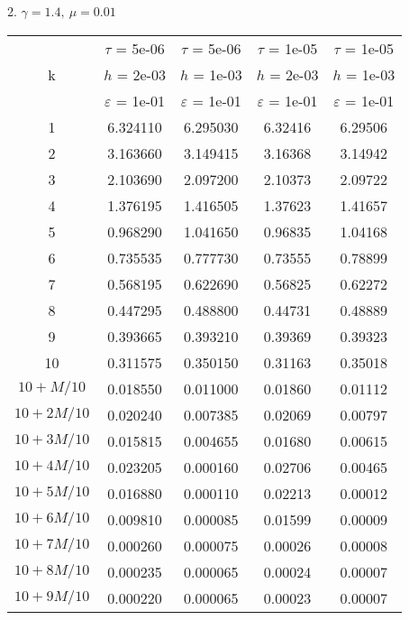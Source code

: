 2. $\gamma = 1.4, \ \mu = 0.01$
\begin{center}
	\begin{tabular}{ |c|c|c|c|c| } 
		\hline
		& $\tau$ = 5e-06 & $\tau$ = 5e-06 & $\tau$ = 1e-05 & $\tau$ = 1e-05 \\ 
		k & $h$ = 2e-03 & $h$ = 1e-03 & $h$ = 2e-03 & $h$ = 1e-03 \\ 
		& $\varepsilon$ = 1e-01 & $\varepsilon$ = 1e-01 & $\varepsilon$ = 1e-01 & $\varepsilon$ = 1e-01 \\ 
		\hline
		1 & 6.324110 & 6.295030 & 6.32416 & 6.29506 \\
		\hline
		2 & 3.163660 & 3.149415 & 3.16368 & 3.14942 \\
		\hline
		3 & 2.103690 & 2.097200 & 2.10373 & 2.09722 \\
		\hline
		4 & 1.376195 & 1.416505 & 1.37623 & 1.41657 \\
		\hline
		5 & 0.968290 & 1.041650 & 0.96835 & 1.04168 \\
		\hline
		6 & 0.735535 & 0.777730 & 0.73555 & 0.78899 \\
		\hline
		7 & 0.568195 & 0.622690 & 0.56825 & 0.62272 \\
		\hline
		8 & 0.447295 & 0.488800 & 0.44731 & 0.48889 \\
		\hline
		9 & 0.393665 & 0.393210 & 0.39369 & 0.39323 \\
		\hline
		10 & 0.311575 & 0.350150 & 0.31163 & 0.35018 \\
		\hline
		$10 + M/10$ & 0.018550 & 0.011000 & 0.01860 & 0.01112 \\
		\hline
		$10 + 2M/10$ & 0.020240 & 0.007385 & 0.02069 & 0.00797 \\
		\hline
		$10 + 3M/10$ & 0.015815 & 0.004655 & 0.01680 & 0.00615 \\
		\hline
		$10 + 4M/10$ & 0.023205 & 0.000160 & 0.02706 & 0.00465 \\
		\hline
		$10 + 5M/10$ & 0.016880 & 0.000110 & 0.02213 & 0.00012 \\
		\hline
		$10 + 6M/10$ & 0.009810 & 0.000085 & 0.01599 & 0.00009 \\
		\hline
		$10 + 7M/10$ & 0.000260 & 0.000075 & 0.00026 & 0.00008 \\
		\hline
		$10 + 8M/10$ & 0.000235 & 0.000065 & 0.00024 & 0.00007 \\
		\hline
		$10 + 9M/10$ & 0.000220 & 0.000065 & 0.00023 & 0.00007 \\
		\hline
	\end{tabular}
\end{center}

